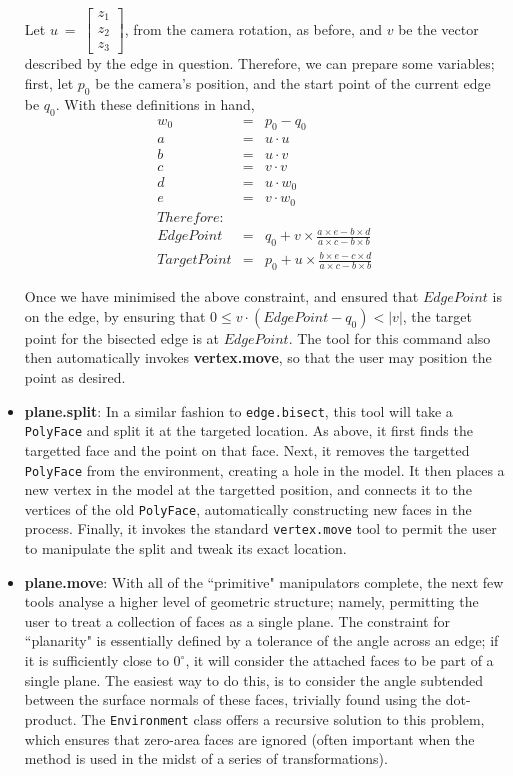 \documentclass[a4paper,10pt]{article}
\begin{document}
\begin{itemize}
{Let $u ~=~ \left[ 
  \begin{array}{c}
    z_1 \\ 
    z_2 \\ 
    z_3 
  \end{array}\right]$, from the camera rotation, as before, and $v$ be the vector described by the edge in question. Therefore, we can prepare some variables; first, let $p_0$ be the camera's position, and the start point of the current edge be $q_0$. With these definitions in hand,
\begin{eqnarray*}
  w_0 &=& p_0 - q_0 \\
  a &=& u \cdot u \\
  b &=& u \cdot v \\
  c &=& v \cdot v \\
  d &=& u \cdot w_0 \\
  e &=& v \cdot w_0 \\
  Therefore:\\
  EdgePoint &=& q_0 + v \times \frac{a \times e - b \times d}{a \times c - b \times b} \\
  TargetPoint &=& p_0 + u \times \frac{b \times e - c \times d}{a \times c - b \times b}
\end{eqnarray*}

Once we have minimised the above constraint, and ensured that $EdgePoint$ is on the edge, by ensuring that $0 \leq v \cdot (EdgePoint - q_0) < |v|$, the target point for the bisected edge is at $EdgePoint$. The tool for this command also then automatically invokes \textbf{vertex.move}, so that the user may position the point as desired.
}
\item{\textbf{plane.split}: In a similar fashion to \texttt{edge.bisect}, this tool will take a \texttt{PolyFace} and split it at the targeted location. As above, it first finds the targetted face and the point on that face. Next, it removes the targetted \texttt{PolyFace} from the environment, creating a hole in the model. It then places a new vertex in the model at the targetted position, and connects it to the vertices of the old \texttt{PolyFace}, automatically constructing new faces in the process. Finally, it invokes the standard \texttt{vertex.move} tool to permit the user to manipulate the split and tweak its exact location.}
\item{\textbf{plane.move}: With all of the ``primitive" manipulators complete, the next few tools analyse a higher level of geometric structure; namely, permitting the user to treat a collection of faces as a single plane. The constraint for ``planarity" is essentially defined by a tolerance of the angle across an edge; if it is sufficiently close to $0^\circ$, it will consider the attached faces to be part of a single plane. The easiest way to do this, is to consider the angle subtended between the surface normals of these faces, trivially found using the dot-product. The \texttt{Environment} class offers a recursive solution to this problem, which ensures that zero-area faces are ignored (often important when the method is used in the midst of a series of transformations).

}
\end{itemize}
\end{document}
